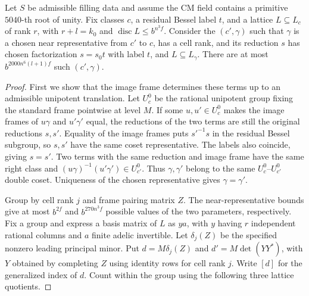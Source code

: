 \begin{lemma}
\label{lem:b-frames-over-lattice}
\emitthmsource
Let $S$ be admissible filling data and assume the CM field contains a primitive $5040$-th root of unity.
Fix classes $c$, a residual Bessel label $t$, and a lattice $L\subseteq L_c$ of rank $r$,
with $r+l=k_0$ and $\operatorname{disc}L\le b^{n^3 f}$.
Consider the $(c',\gamma)$ such that $\gamma$ is a chosen near representative from $c'$ to $c$, has a cell rank,
and its reduction $s$ has chosen factorization $s=s_0t$ with label $t$, and $L\subseteq L_\gamma$.
There are at most $b^{2000n^6(l+1)f}$ such $(c',\gamma)$.
\end{lemma}
\begin{proof}
First we show that the image frame determines these terms up to an admissible unipotent translation.
Let $U_c^0$ be the rational unipotent group fixing the standard frame pointwise at level $M$.
If some $u,u'\in U_c^0$ makes the image frames of $u\gamma$ and $u'\gamma'$ equal,
the reductions of the two terms are still the original reductions $s,s'$.
Equality of the image frames puts $s'^{-1}s$ in the residual Bessel subgroup, so $s,s'$ have the same coset representative.
The labels also coincide, giving $s=s'$. Two terms with the same reduction and image frame
have the same right class and $(u\gamma)^{-1}(u'\gamma')\in U_{c'}^0$.
Thus $\gamma,\gamma'$ belong to the same $U_c^0$--$U_{c'}^0$ double coset.
Uniqueness of the chosen representative gives $\gamma=\gamma'$.

Group by cell rank $j$ and frame pairing matrix $Z$. The near-representative bounds give
at most $b^{2f}$ and $b^{270n^3 f}$ possible values of the two parameters, respectively.
Fix a group and express a basis matrix of $L$ as $ya$, with $y$ having $r$ independent rational columns
and $a$ finite adelic invertible. Let $\delta_j(Z)$ be the specified nonzero leading principal minor.
Put $d=M\delta_j(Z)$ and $d'=M\det(YY^*)$, with $Y$ obtained by completing $Z$ using identity rows for cell rank $j$.
Write $[d]$ for the generalized index of $d$. Count within the group using the following three lattice quotients.


\end{proof}
